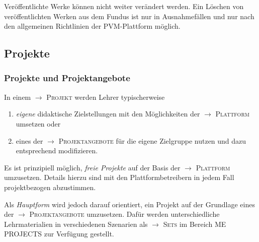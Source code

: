 \documentclass[a4paper,11pt]{article}
\newcommand{\glossar}[1]{{$\to$ \textsc{#1}}}
\begin{document}
Veröffentlichte Werke können nicht weiter verändert werden.  Ein Löschen von
veröffentlichten Werken aus dem Fundus ist nur in Ausnahmefällen und nur nach
den allgemeinen Richtlinien der PVM-Plattform möglich.

\subsection{Projekte}\label{grundlagen.projekte}

\subsubsection{Projekte und Projektangebote}

In einem \glossar{Projekt} werden Lehrer typischerweise 
\begin{enumerate}\itemsep0pt
\item \emph{eigene} didaktische Zielstellungen mit den Möglichkeiten der
  \glossar{Plattform} umsetzen oder
\item eines der \glossar{Projektangebote} für die eigene Zielgruppe nutzen und
  dazu entsprechend modifizieren.
\end{enumerate}
Es ist prinzipiell möglich, \emph{freie Projekte} auf der Basis der
\glossar{Plattform} umzusetzen.  Details hierzu sind mit den
Plattformbetreibern in jedem Fall projektbezogen abzustimmen.

Als \emph{Hauptform} wird jedoch darauf orientiert, ein Projekt auf der
Grundlage eines der \glossar{Projektangebote} umzusetzen. Dafür werden
unterschiedliche Lehrmaterialien in verschiedenen Szenarien als \glossar{Sets}
im Bereich ME PROJECTS zur Verfügung gestellt. 
\end{document}
